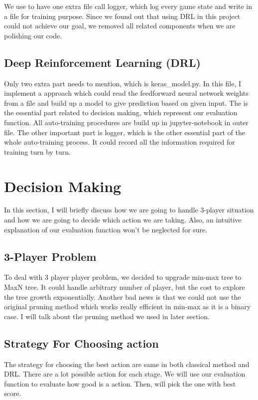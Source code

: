 \documentclass[11pt]{article}
\begin{document}
We use to have one extra file call logger, which log every game state and write in a file for training purpose.
Since we found out that using DRL in this project could not achieve our goal, we removed all related components
when we are polishing our code.

\subsection{Deep Reinforcement Learning (DRL)}
Only two extra part needs to mention, which is keras\_model.py. 
In this file, I implement a approach which could read
the feedforward neural network weights from a file and build up a model to give prediction based on given input.
The is the essential part related to decision making, which represent our evaluation function. All auto-training 
procedures are build up in jupyter-notebook in outer file.
The other important part is logger, which is the other essential part of the whole auto-training process. It could
record all the information required for training turn by turn.

\section{Decision Making}
In this section, I will briefly discuss how we are going to handle 3-player situation and how we are going to decide
which action we are taking. Also, an intuitive explanation of our evaluation function won't be neglected for sure.

\subsection{3-Player Problem}

To deal with 3 player player problem, we decided to upgrade min-max tree to MaxN tree. It could handle arbitrary
number of player, but the cost to explore the tree growth exponentially. Another bad news is that we could not
use the original pruning method which works really efficient in min-max as it is a binary case. I will talk about
the pruning method we used in later section.

\subsection{Strategy For Choosing action}
The strategy for choosing the best action are same in both classical method and DRL. There are a lot possible 
action for each stage. We will use our evaluation function to evaluate how good is a action. Then, will pick
the one with best score.
\end{document}
